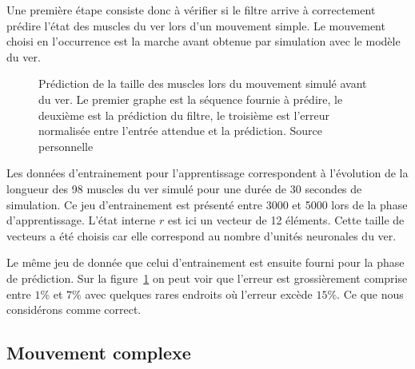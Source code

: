 Une première étape consiste donc à vérifier si le filtre arrive à correctement
prédire l'état des muscles du ver lors d'un mouvement simple. Le mouvement
choisi en l'occurrence est la marche avant obtenue par simulation avec le
modèle du ver.

\begin{figure}[ht]
   \begin{center}
   \end{center}
   \caption[Prédiction de la taille des muscles lors du mouvement simulé
   avant du ver]{Prédiction de la taille des muscles lors du mouvement simulé
   avant du ver. Le premier graphe est la séquence fournie à prédire, le
   deuxième est la prédiction du filtre, le troisième est l'erreur normalisée
   entre l'entrée attendue et la prédiction. Source personnelle}
   \label{fig:sequence_ver_complet}
\end{figure}

Les données d'entrainement pour l'apprentissage correspondent à l'évolution de
la longueur des 98 muscles du ver simulé pour une durée de 30 secondes de
simulation. Ce jeu d'entrainement est présenté entre 3000 et 5000 lors de la
phase d'apprentissage. L'état interne $r$ est ici un vecteur de 12 éléments.
Cette taille de vecteurs a été choisis car elle correspond au nombre d'unités
neuronales du ver.

Le même jeu de donnée que celui d'entrainement est ensuite fourni pour la phase
de prédiction. Sur la figure~\ref{fig:sequence_ver_complet} on peut voir que l'erreur
est grossièrement comprise entre $1\%$ et $7\%$ avec quelques rares endroits où l'erreur
excède $15\%$. Ce que nous considérons comme correct.


\subsection{Mouvement complexe} %
\label{sub:Mouvement complexe}



